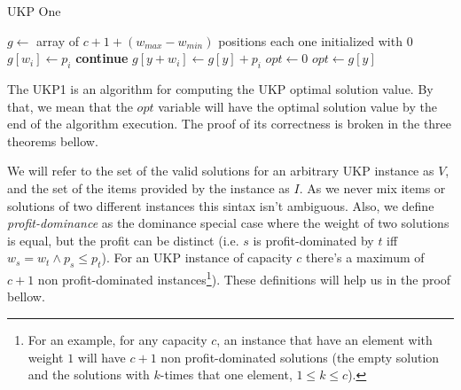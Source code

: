 \documentclass[12pt]{article}
\begin{document}
\begin{algorithm}
\caption{UKP One}\label{alg:ukp1}
\begin{algorithmic}[1]
  \State \(g \gets\) array of \(c + 1 + (w_{max} - w_{min})\) positions each one initialized with \(0\)\label{ukp1:create_g}
  \State %
  \label{begin_trivial_bounds}
      \State \(g[w_i] \gets p_i\)
    \EndIf
  \EndFor\label{end_trivial_bounds}
  \State %
  \label{ukp1:main_ext_loop_begin}
    \label{ukp1:if_equal_to_zero}
    	\State \textbf{continue}
    \EndIf\label{ukp1:if_equal_to_zero}
    \State %
    \label{ukp1:main_inner_loop_begin}
      \label{ukp1:if_better_solution_begin}
        \State \(g[y + w_i] \gets g[y] + p_i\)
      \EndIf\label{ukp1:if_better_solution_end}
    \EndFor\label{ukp1:main_inner_loop_end}
  \EndFor\label{ukp1:main_ext_loop_end}
  \State %
  \State \(opt \gets 0\)
  \label{ukp1:get_opt_loop_begin}
    \label{ukp1:opt_loop_if}
      \State \(opt \gets g[y]\)
    \EndIf
  \EndFor\label{ukp1:get_opt_loop_end}
\EndProcedure
\end{algorithmic}
\end{algorithm}

The UKP1 is an algorithm for computing the UKP optimal solution value. By that, we mean that the \(opt\) variable will have the optimal solution value by the end of the algorithm execution. The proof of its correctness is broken in the three theorems bellow.

We will refer to the set of the valid solutions for an arbitrary UKP instance as \(V\), and the set of the items provided by the instance as \(I\). As we never mix items or solutions of two different instances this sintax isn't ambiguous. Also, we define \textit{profit-dominance} as the dominance special case where the weight of two solutions is equal, but the profit can be distinct (i.e. \(s\) is profit-dominated by \(t\) iff \(w_s = w_t \land p_s \leq p_t\)). For an UKP instance of capacity \(c\) there's a maximum of \(c+1\) non profit-dominated instances\footnote{For an example, for any capacity \(c\), an instance that have an element with weight \(1\) will have \(c+1\) non profit-dominated solutions (the empty solution and the solutions with \(k\)-times that one element, \(1 \leq k \leq c\)).}). These definitions will help us in the proof bellow.
\end{document}
